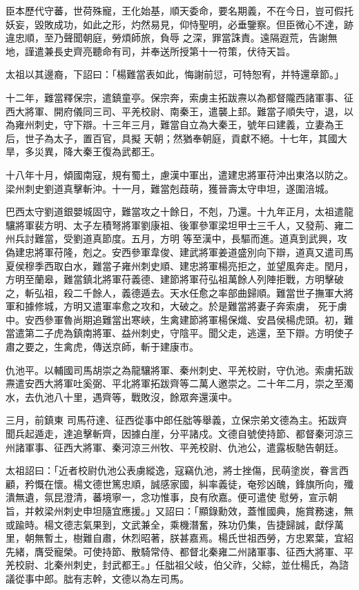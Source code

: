\begin{pinyinscope}
 臣本歷代守蕃，世荷殊寵，王化始基，順天委命，要名期義，不在今日，豈可假托妖妄，毀敗成功，如此之形，灼然易見，仰恃聖明，必垂鑒察。但臣微心不達，跡違忠順，至乃聲聞朝庭，勞煩師旅，負辱
 之深，罪當誅責。遠隔遐荒，告謝無地，謹遣兼長史齊亮聽命有司，并奉送所授第十一符策，伏待天旨。



 太祖以其邊裔，下詔曰：「楊難當表如此，悔謝前愆，可特恕宥，并特還章節。」



 十二年，難當釋保宗，遣鎮童亭。保宗奔，索虜主拓跋燾以為都督隴西諸軍事、征西大將軍、開府儀同三司、平羌校尉、南秦王，遣襲上邽。難當子順失守，退，以為雍州刺史，守下辯。十三年三月，難當自立為大秦王，號年曰建義，立妻為王后，世子為太子，置百官，具擬
 天朝；然猶奉朝庭，貢獻不絕。十七年，其國大旱，多災異，降大秦王復為武都王。



 十八年十月，傾國南寇，規有蜀土，慮漢中軍出，遣建忠將軍苻沖出東洛以防之。梁州刺史劉道真擊斬沖。十一月，難當剋葭萌，獲晉壽太守申坦，遂圍涪城。



 巴西太守劉道銀嬰城固守，難當攻之十餘日，不剋，乃還。十九年正月，太祖遣龍驤將軍裴方明、太子左積弩將軍劉康祖、後軍參軍梁坦甲士三千人，又發荊、雍二州兵討難當，受劉道真節度。五月，方明
 等至漢中，長驅而進。道真到武興，攻偽建忠將軍苻隆，剋之。安西參軍韋俊、建武將軍姜道盛別向下辯，道真又遣司馬夏侯穆季西取白水，難當子雍州刺史順、建忠將軍楊亮拒之，並望風奔走。閏月，方明至蘭皋，難當鎮北將軍苻義德、建節將軍苻弘祖萬餘人列陣拒戰，方明擊破之，斬弘祖，殺二千餘人，義德遁去。天水任愈之率部曲歸順。難當世子撫軍大將軍和據修城，方明又遣軍率愈之攻和，大破之。於是難當將妻子奔索虜，
 死于虜中。安西參軍魯尚期追難當出寒峽，生禽建節將軍楊保熾、安昌侯楊虎頭。初，難當遣第二子虎為鎮南將軍、益州刺史，守陰平。聞父走，逃還，至下辯。方明使子肅之要之，生禽虎，傳送京師，斬于建康市。



 仇池平。以輔國司馬胡崇之為龍驤將軍、秦州刺史、平羌校尉，守仇池。索虜拓跋燾遣安西大將軍吐奚弼、平北將軍拓跋齊等二萬人邀崇之。二十年二月，崇之至濁水，去仇池八十里，遇齊等，戰敗沒，餘眾奔還漢中。



 三月，前鎮東
 司馬苻達、征西從事中郎任朏等舉義，立保宗弟文德為主。拓跋齊聞兵起遁走，達追擊斬齊，因據白崖，分平諸戍。文德自號使持節、都督秦河涼三州諸軍事、征西大將軍、秦河涼三州牧、平羌校尉、仇池公，遣露板馳告朝廷。



 太祖詔曰：「近者校尉仇池公表虜縱逸，寇竊仇池，將士挫傷，民萌塗炭，眷言西顧，矜慨在懷。楊文德世篤忠順，誠感家國，糾率義徒，奄殄凶醜，鋒旗所向，殲潰無遺，氛昆澄清，蕃境寧一，念功惟事，良有欣嘉。便可遣使
 慰勞，宣示朝旨，并敕梁州刺史申坦隨宜應援。」又詔曰：「顯錄勳效，蓋惟國典，施賞務速，無或踰時。楊文德志氣果到，文武兼全，乘機潛奮，殊功仍集，告捷歸誠，獻俘萬里，朝無暫土，樹難自肅，休烈昭著，朕甚嘉焉。楊氏世祖西勞，方忠累葉，宜紹先緒，膺受寵榮。可使持節、散騎常侍、都督北秦雍二州諸軍事、征西大將軍、平羌校尉、北秦州刺史，封武都王。」任朏祖父岐，伯父祚，父綜，並仕楊氏，為諮議從事中郎。朏有志幹，文德以為左司馬。




\end{pinyinscope}
